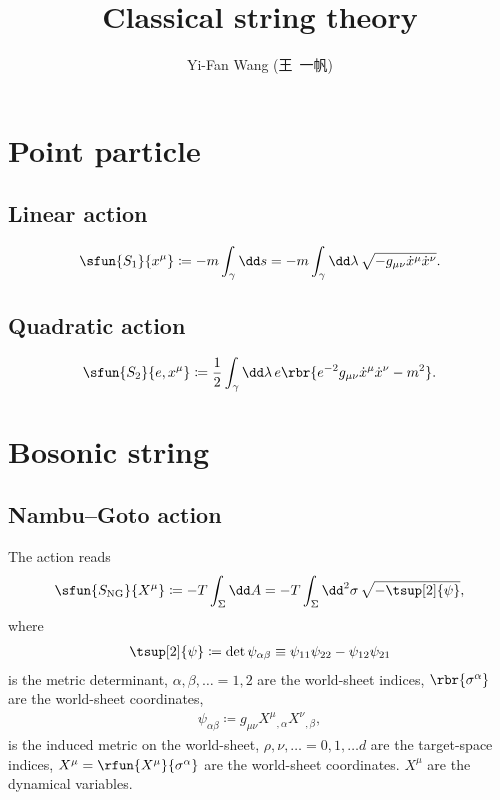 \documentclass[a4paper,11pt]{article}
\title{Classical string theory}
\author{Yi-Fan Wang (王\ 一帆)}
\begin{document}
\maketitle

\section{Point particle}
\label{sec:pnt-ptc}

\subsection{Linear action}
\label{sec:pnt-ptc-lin}

\begin{align}
\sfun{S_1}{x^{\mu}} \coloneqq -m \int_{\gamma} \dd s = 
-m \int_{\gamma} \dd \lambda\, \sqrt{-g_{\mu\nu}
	\dot{x}^{\mu} \dot{x}^{\nu} }.
\end{align}

\subsection{Quadratic action}
\label{sec:pnt-ptc-qua}

\begin{align}
\sfun{S_2}{e, x^{\mu}} \coloneqq \frac{1}{2} \int_{\gamma} \dd\lambda\, e
\rbr{e^{-2} g_{\mu\nu} \dot{x}^{\mu} \dot{x}^{\nu} - m^2}.
\end{align}


\section{Bosonic string}
\label{sec:bos-str}

\subsection{Nambu--Goto action}
\label{sec:bos-str-nam}

The action reads \cite{Nambu1970a,Goto1971}
\begin{align}
\sfun{S_{\text{NG}}}{X^{\mu}} \coloneqq -T \int_{\Sigma} \dd A = 
-T \int_{\Sigma} \dd^2 \sigma\,\sqrt{-\tsup[2]{\psi}},
\end{align}
where
\begin{align}
\tsup[2]{\psi} \coloneqq \det \psi_{\alpha\beta} \equiv
\psi_{11}\psi_{22} - \psi_{12}\psi_{21}
\end{align}
is the metric determinant, $\alpha, \beta, \ldots = 1, 2$ are the world-sheet 
indices, $\rbr{\sigma^\alpha}$ are the world-sheet coordinates, 
\begin{align}
\psi_{\alpha\beta} \coloneqq g_{\mu\nu} 
X^{\mu}{}_{,\alpha} X^{\nu}{}_{,\beta},
\end{align}
is the induced metric on the world-sheet, $\rho, \nu, \ldots = 0, 1, \ldots d$ 
are the target-space indices, $X^{\mu} = \rfun{X^{\mu}}{\sigma^{\alpha}}$ are 
the world-sheet coordinates. $X^{\mu}$ are the dynamical variables.
\end{document}

